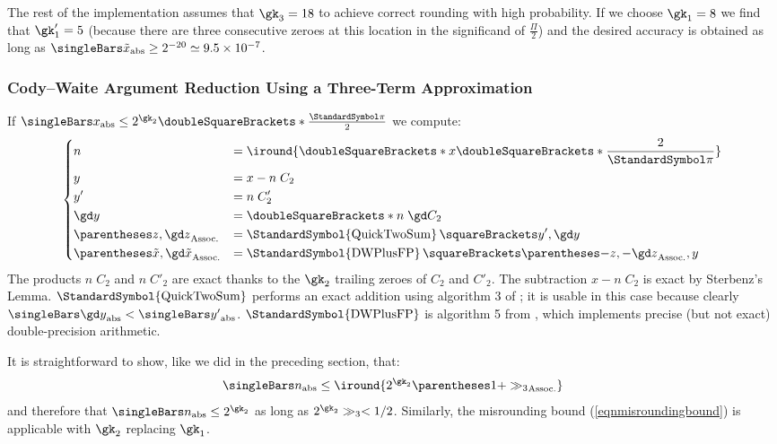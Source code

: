 \documentclass[10pt, a4paper, twoside]{basestyle}
\DeclareMathOperator{\quicktwosum}{\StandardSymbol{QuickTwoSum}}
\DeclareMathOperator{\dwplusfp}{\StandardSymbol{DWPlusFP}}
\newcommand{\round}[1]{\doubleSquareBrackets*{#1}}
\newcommand{\red}[1]{\tilde{#1}}
\begin{document}
The rest of the implementation assumes that $\gk_3 = 18$ to achieve correct rounding with high probability.  If we choose $\gk_1 = 8$ we find that $\gk'_1 = 5$ (because there are three consecutive zeroes at this location in the significand of $\frac{\Pi}{2}$) and the desired accuracy is obtained as long as $\abs{\red x} \geq 2^{-20} \simeq 9.5 \times 10^{-7}$.

\subsubsection*{Cody--Waite Argument Reduction Using a Three-Term Approximation}

If $\abs x \leq 2^{\gk_2} \round{\frac{\Pi}{2}}$ we compute:
\[
\begin{dcases}
n &= \iround{\round{x \round{\frac{2}{\Pi}}}} \\
y &= x - n \; C_2 \\
y' &= n \; C'_2 \\
\gd y &= \round{n \; \gd C_2} \\
\pa{z, \gd z} &= \quicktwosum\of{y', \gd y} \\
\pa{\red x, \gd \red x} &= \dwplusfp\of{\pa{-z, -\gd z}, y}
\end{dcases}
\]
The products $n \; C_2$ and $n \; C'_2$ are exact thanks to the $\gk_2$ trailing zeroes of $C_2$ and $C'_2$.  The subtraction $x - n \; C_2$ is exact by Sterbenz's Lemma.  $\quicktwosum$ performs an exact addition using algorithm 3 of \cite{HidaLiBailey2007}; it is usable in this case because clearly $\abs{\gd y} < \abs{y'}$.
$\dwplusfp$ is algorithm 5 from \cite{MullerRideau2022}, which implements precise (but not exact) double-precision arithmetic.

It is straightforward to show, like we did in the preceding section, that:
\[
\abs n \leq \iround{2^{\gk_2} \pa{1 + \gg_3}}
\]
and therefore that $\abs n \leq 2^{\gk_2}$ as long as $2^{\gk_2} \gg_3 < 1/2$.  Similarly, the misrounding bound (\ref{eqnmisroundingbound}) is applicable with $\gk_2$ replacing $\gk_1$.
\end{document}
